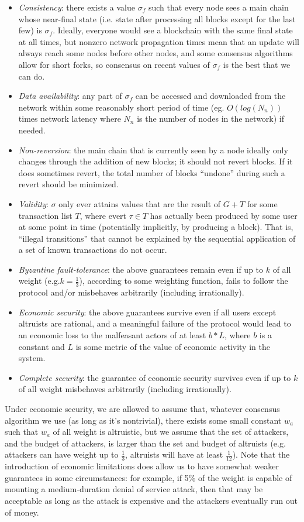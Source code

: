 \documentclass[11pt,a4paper]{article}
\makeatletter
\theoremstyle{plain}
\theoremstyle{definition}
\theoremstyle{remark}
\newcommand{\ie}{i.e.\@\xspace}
\newcommand{\eg}{e.g.\@\xspace}
\makeatother
\begin{document}
\begin{itemize}
\item
\emph{Consistency}: there exists a value $\sigma_f$ such that every node sees a main chain whose near-final state (\ie state after processing all blocks except for the last few) is $\sigma_f$. Ideally, everyone would see a blockchain with the same final state at all times, but nonzero network propagation times mean that an update will always reach some nodes before other nodes, and some consensus algorithms allow for short forks, so consensus on recent values of $\sigma_f$ is the best that we can do.
\item
\emph{Data availability}: any part of $\sigma_f$ can be accessed and downloaded from the network within some reasonably short period of time (eg. $O(log(N_n))$ times network latency where $N_n$ is the number of nodes in the network) if needed.
\item
\emph{Non-reversion}: the main chain that is currently seen by a node ideally only changes through the addition of new blocks; it should not revert blocks. If it does sometimes revert, the total number of blocks  ``undone'' during such a revert should be minimized.
\item
\emph{Validity}: $\sigma$ only ever attains values that are the result of $G + T$ for some transaction list $T$, where evert $\tau \in T$ has actually been produced by some user at some point in time (potentially implicitly, by producing a block). That is, ``illegal transitions'' that cannot be explained by the sequential application of a set of known transactions do not occur.
\item
\emph{Byzantine fault-tolerance}: the above guarantees remain even if up to $k$ of all weight (\eg $k = \frac{1}{3}$), according to some weighting function, fails to follow the protocol and/or misbehaves arbitrarily (including irrationally).
\item
\emph{Economic security}: the above guarantees survive even if all users except altruists are rational, and a meaningful failure of the protocol would lead to an economic loss to the malfeasant actors of at least $b * L$, where $b$ is a constant and $L$ is some metric of the value of economic activity in the system. 
\item
\emph{Complete security}: the guarantee of economic security survives even if up to $k$ of all weight misbehaves arbitrarily (including irrationally).
\end{itemize}

Under economic security, we are allowed to assume that, whatever consensus algorithm we use (as long as it's nontrivial), there exists some small constant $w_a$ such that $w_a$ of all weight is altruistic, but we assume that the set of attackers, and the budget of attackers, is larger than the set and budget of altruists (\eg attackers can have weight up to $\frac{1}{3}$, altruists will have at least $\frac{1}{12}$). Note that the introduction of economic limitations does allow us to have somewhat weaker guarantees in some circumstances: for example, if 5\% of the weight is capable of mounting a medium-duration denial of service attack, then that may be acceptable as long as the attack is expensive and the attackers eventually run out of money.
\end{document}
